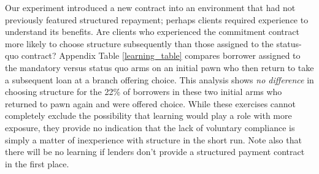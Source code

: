 \documentclass[12pt, a4paper, colorinlistoftodos]{article}
\begin{document}

Our experiment introduced a new contract into an environment that had not previously featured structured repayment; perhaps clients required experience to understand its benefits. Are clients who experienced the commitment contract more likely to choose structure subsequently than those assigned to the status-quo contract? %
Appendix Table \ref{learning_table} compares borrower assigned to the mandatory versus status quo arms on an initial pawn who then return to take a subsequent loan at a branch offering choice.  %
This analysis shows \textit{no difference} in choosing structure for the 22\% of borrowers in these two initial arms who returned to pawn again and were offered choice.   %
While these exercises cannot completely exclude the possibility that learning would play a role with more exposure, they provide no indication that the lack of voluntary compliance is simply a matter of inexperience with structure in the short run. Note also that there will be no learning if lenders don't provide a structured payment contract in the first place.
\end{document}
